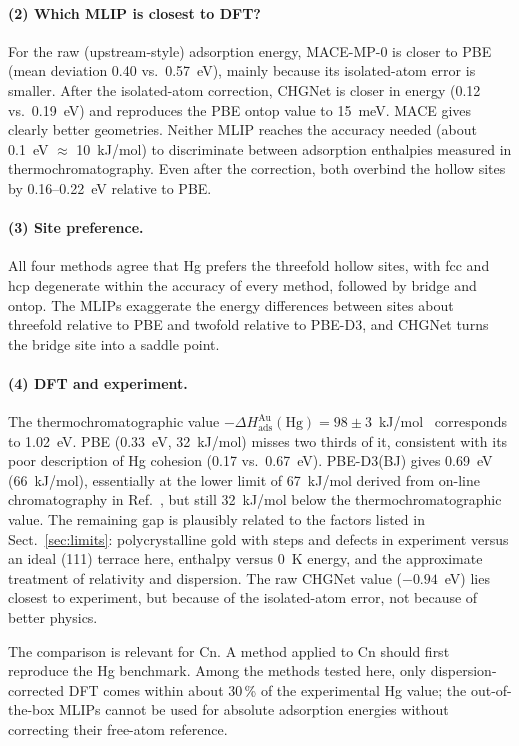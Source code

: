 \documentclass[11pt,a4paper]{article}
\begin{document}
\paragraph{(2) Which MLIP is closest to DFT?} For the raw (upstream-style) adsorption energy, MACE-MP-0 is closer to PBE (mean deviation 0.40 vs.\ 0.57~eV), mainly because its isolated-atom error is smaller. After the isolated-atom correction, CHGNet is closer in energy (0.12 vs.\ 0.19~eV) and reproduces the PBE ontop value to 15~meV. MACE gives clearly better geometries. Neither MLIP reaches the accuracy needed (about 0.1~eV $\approx$ 10~kJ/mol) to discriminate between adsorption enthalpies measured in thermochromatography. Even after the correction, both overbind the hollow sites by 0.16--0.22~eV relative to PBE.

\paragraph{(3) Site preference.} All four methods agree that Hg prefers the threefold hollow sites, with fcc and hcp degenerate within the accuracy of every method, followed by bridge and ontop. The MLIPs exaggerate the energy differences between sites about threefold relative to PBE and twofold relative to PBE-D3, and CHGNet turns the bridge site into a saddle point.

\paragraph{(4) DFT and experiment.} The thermochromatographic value $-\Delta H_\mathrm{ads}^\mathrm{Au}(\mathrm{Hg}) = 98\pm3$~kJ/mol~\cite{soverna2005,lens2018} corresponds to 1.02~eV. PBE (0.33~eV, 32~kJ/mol) misses two thirds of it, consistent with its poor description of Hg cohesion (0.17 vs.\ 0.67~eV). PBE-D3(BJ) gives 0.69~eV (66~kJ/mol), essentially at the lower limit of 67~kJ/mol derived from on-line chromatography in Ref.~\cite{lens2018}, but still 32~kJ/mol below the thermochromatographic value. The remaining gap is plausibly related to the factors listed in Sect.~\ref{sec:limits}: polycrystalline gold with steps and defects in experiment versus an ideal (111) terrace here, enthalpy versus 0~K energy, and the approximate treatment of relativity and dispersion. The raw CHGNet value ($-0.94$~eV) lies closest to experiment, but because of the isolated-atom error, not because of better physics.

The comparison is relevant for Cn. A method applied to Cn should first reproduce the Hg benchmark. Among the methods tested here, only dispersion-corrected DFT comes within about 30\,\% of the experimental Hg value; the out-of-the-box MLIPs cannot be used for absolute adsorption energies without correcting their free-atom reference.
\end{document}
